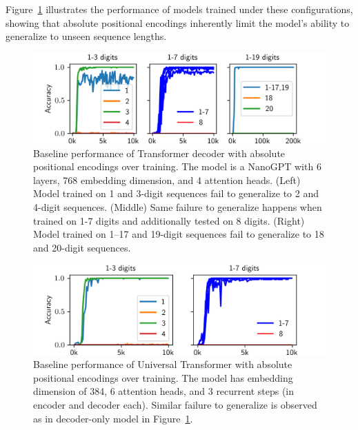 Figure~\ref{fig:baseline_and_longer} illustrates the performance of models trained under these configurations, showing that absolute positional encodings inherently limit the model's ability to generalize to unseen sequence lengths.

\begin{figure}[h!]
    \centering
    \includegraphics[width=\textwidth]{fig/baseline_and_longer.png}
    \caption{Baseline performance of Transformer decoder with absolute positional encodings over training. The model is a NanoGPT with 6 layers, 768 embedding dimension, and 4 attention heads. (Left) Model trained on 1 and 3-digit sequences fail to generalize to 2 and 4-digit sequences. (Middle) Same failure to generalize happens when trained on 1-7 digits and additionally tested on 8 digits. (Right) Model trained on 1--17 and 19-digit sequences fail to generalize to 18 and 20-digit sequences.}
    \label{fig:baseline_and_longer}
\end{figure}

\begin{figure}[h!]
    \centering
    \includegraphics[width=\textwidth]{fig/baseline_and_longer_ut.png}
    \caption{Baseline performance of Universal Transformer with absolute positional encodings over training. The model has embedding dimension of 384, 6 attention heads, and 3 recurrent steps (in encoder and decoder each). Similar failure to generalize is observed as in decoder-only model in Figure~\ref{fig:baseline_and_longer}.}
    \label{fig:baseline_and_longer_ut}
\end{figure}

